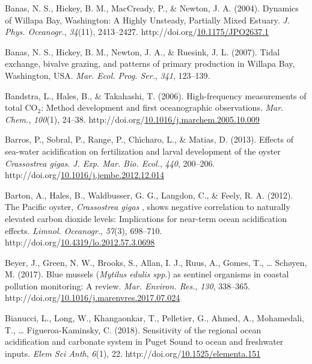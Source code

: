 \documentclass [11pt, proquest] {uwthesis}[2015/03/03]
\newlength{\cslhangindent}
\newenvironment{CSLReferences}%
{\setlength{\parindent}{0pt}%
\everypar{\setlength{\hangindent}{\cslhangindent}}\ignorespaces}%
{\par}
\begin{document}
\begin{CSLReferences}{1}{0}
\leavevmode\hypertarget{ref-Banas2004}{}%
Banas, N. S., Hickey, B. M., MacCready, P., \& Newton, J. A. (2004). {Dynamics of Willapa Bay, Washington: A Highly Unsteady, Partially Mixed Estuary}. \emph{J. Phys. Oceanogr.}, \emph{34}(11), 2413--2427. http://doi.org/\href{https://doi.org/10.1175/JPO2637.1}{10.1175/JPO2637.1}

\leavevmode\hypertarget{ref-Banas2007}{}%
Banas, N. S., Hickey, B. M., Newton, J. A., \& Ruesink, J. L. (2007). {Tidal exchange, bivalve grazing, and patterns of primary production in Willapa Bay, Washington, USA}. \emph{Mar. Ecol. Prog. Ser.}, \emph{341}, 123--139.

\leavevmode\hypertarget{ref-Bandstra2006}{}%
Bandstra, L., Hales, B., \& Takahashi, T. (2006). {High-frequency measurements of total {CO\(_2\)}: Method development and first oceanographic observations}. \emph{Mar. Chem.}, \emph{100}(1), 24--38. http://doi.org/\href{https://doi.org/10.1016/j.marchem.2005.10.009}{10.1016/j.marchem.2005.10.009}

\leavevmode\hypertarget{ref-Barros2013}{}%
Barros, P., Sobral, P., Range, P., Chı́charo, L., \& Matias, D. (2013). {Effects of sea-water acidification on fertilization and larval development of the oyster \emph{Crassostrea gigas}}. \emph{J. Exp. Mar. Bio. Ecol.}, \emph{440}, 200--206. http://doi.org/\href{https://doi.org/10.1016/j.jembe.2012.12.014}{10.1016/j.jembe.2012.12.014}

\leavevmode\hypertarget{ref-Barton2012}{}%
Barton, A., Hales, B., Waldbusser, G. G., Langdon, C., \& Feely, R. A. (2012). {The Pacific oyster, \emph{Crassostrea gigas} , shows negative correlation to naturally elevated carbon dioxide levels: Implications for near-term ocean acidification effects}. \emph{Limnol. Oceanogr.}, \emph{57}(3), 698--710. http://doi.org/\href{https://doi.org/10.4319/lo.2012.57.3.0698}{10.4319/lo.2012.57.3.0698}

\leavevmode\hypertarget{ref-Beyer2017}{}%
Beyer, J., Green, N. W., Brooks, S., Allan, I. J., Ruus, A., Gomes, T., \ldots{} Schøyen, M. (2017). {Blue mussels (\emph{Mytilus edulis spp}.) as sentinel organisms in coastal pollution monitoring: A review}. \emph{Mar. Environ. Res.}, \emph{130}, 338--365. http://doi.org/\href{https://doi.org/10.1016/j.marenvres.2017.07.024}{10.1016/j.marenvres.2017.07.024}

\leavevmode\hypertarget{ref-Bianucci2018}{}%
Bianucci, L., Long, W., Khangaonkar, T., Pelletier, G., Ahmed, A., Mohamedali, T., \ldots{} Figueroa-Kaminsky, C. (2018). {Sensitivity of the regional ocean acidification and carbonate system in Puget Sound to ocean and freshwater inputs}. \emph{Elem Sci Anth}, \emph{6}(1), 22. http://doi.org/\href{https://doi.org/10.1525/elementa.151}{10.1525/elementa.151}


\end{CSLReferences}
\end{document}
